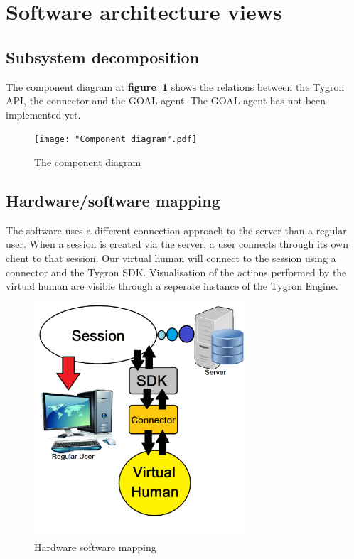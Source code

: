 \label{Software architecture views}
\section{Software architecture views}

\subsection{Subsystem decomposition}

The component diagram at \textbf{figure~\ref{fig:comp_diag}} shows the relations between the Tygron API, the connector and the GOAL agent. The GOAL agent has not been implemented yet. 

\begin{figure}[h]
	  \centering
	  \texttt{[image: "Component diagram".pdf]}
	  \caption{The component diagram}
	  \label{fig:comp_diag}
\end{figure}

\subsection{Hardware/software mapping}
The software uses a different connection approach to the server than a regular user. When a session is created via the server, a user connects through its own client to that session. Our virtual human will connect to the session using a connector and the Tygron SDK. Visualisation of the actions performed by the virtual human are visible through a seperate instance of the Tygron Engine.

\begin{figure}
	\centering
	\includegraphics[width=0.7\textwidth]{Hardware_software_mapping}
	\caption{Hardware software mapping}
	\label{fig:Hard_soft_map}
\end{figure}

